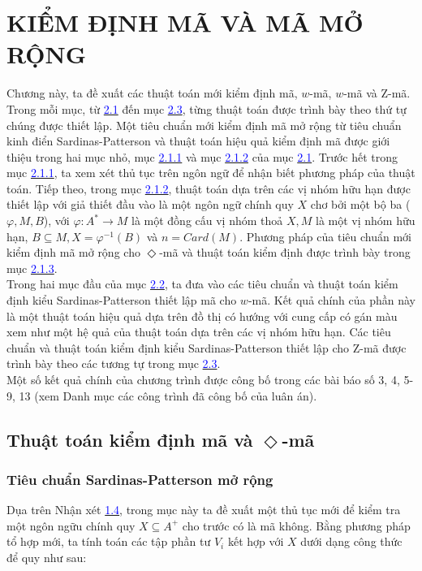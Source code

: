 \chapter{KIỂM ĐỊNH MÃ VÀ MÃ MỞ RỘNG}

\begin{flushleft}
Chương này, ta đề xuất các thuật toán mới kiểm định mã, $w$-mã, $w$-mã và Z-mã. Trong mỗi mục, từ \hyperlink{42}{\textcolor{blue}{2.1}} đến mục \hyperlink{page.52}{\textcolor{blue}{2.3}}, từng thuật toán được trình bày theo thứ tự chúng được thiết lập. Một tiêu chuẩn mới kiểm định mã mở rộng từ tiêu chuẩn kinh điển Sardinas-Patterson và thuật toán hiệu quả kiểm định mã được giới thiệu trong hai mục nhỏ, mục \hyperlink{page.42}{\textcolor{blue}{2.1.1}} và mục \hyperlink{page.32}{\textcolor{blue}{2.1.2}} của mục \hyperlink{page.42}{\textcolor{blue}{2.1}}. Trước hết trong mục \hyperlink{page.42}{\textcolor{blue}{2.1.1}}, ta xem xét thủ tục trên ngôn ngữ để nhận biết phương pháp của thuật toán. Tiếp theo, trong mục \hyperlink{page.42}{\textcolor{blue}{2.1.2}}, thuật toán dựa trên các vị nhóm hữu hạn được thiết lập với giả thiết đầu vào là một ngôn ngữ chính quy $X$ chơ bởi một bộ ba ($\varphi, M, B$), với $\varphi : A^* \to M$ là một đồng cấu vị nhóm thoả $X, M$ là một vị nhóm hữu hạn, $B \subseteq M, X = \varphi^{-1} (B)$ và $n = Card(M)$. Phương pháp của tiêu chuẩn mới kiểm định mã mở rộng cho $\Diamond$-mã và thuật toán kiểm định được trình bày trong mục \hyperlink{page.44}{\textcolor{blue}{2.1.3}}. \\
\hspace{10mm}Trong hai mục đầu của mục \hyperlink{page.46}{\textcolor{blue}{2.2}}, ta đưa vào các tiêu chuẩn và thuật toán kiểm định kiểu Sardinas-Patterson thiết lập mã cho $w$-mã. Kết quả chính của phần này là một thuật toán hiệu quả dựa trên đồ thị có hướng với cung cấp có gán màu xem như một hệ quả của thuật toán dựa trên các vị nhóm hữu hạn. Các tiêu chuẩn và thuật toán kiểm định kiểu Sardinas-Patterson thiết lập cho Z-mã được trình bày theo các tương tự trong mục \hyperlink{page.52}{\textcolor{blue}{2.3}}.\\
\hspace{10mm}Một số kết quả chính của chương trình được công bố trong các bài báo số 3, 4, 5-9, 13 (xem Danh mục các công trình đã công bố của luân án).\\
\section{Thuật toán kiểm định mã và $\Diamond$-mã}
\subsection{Tiêu chuẩn Sardinas-Patterson mở rộng}
Dụa trên Nhận xét \hyperlink{page.18}{\textcolor{blue}{1.4}}, trong mục này ta đề xuất một thủ tục mới để kiểm tra một ngôn ngữu chính quy $X \subseteq A^+$ cho trước có là mã không. Bằng phương pháp tổ hợp mới, ta tính toán các tập phần tư $V_i$ kết hợp với $X$ dưới dạng công thức để quy như sau:
\end{flushleft}
